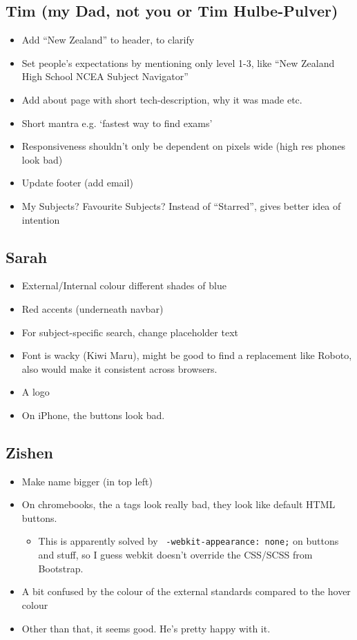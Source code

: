 \documentclass{article}
\begin{document}
\subsection*{Tim (my Dad, not you or Tim Hulbe-Pulver)}
\begin{itemize}
    \item Add ``New Zealand'' to header, to clarify
    \item Set people's expectations by mentioning only level 1-3, like ``New Zealand High School NCEA Subject Navigator''
    \item Add about page with short tech-description, why it was made etc.
    \item Short mantra e.g. `fastest way to find exams'
    \item Responsiveness shouldn't only be dependent on pixels wide (high res phones look bad)
    \item Update footer (add email)
    \item My Subjects? Favourite Subjects? Instead of ``Starred'', gives better idea of intention
\end{itemize}

\subsection*{Sarah}
\begin{itemize}
    \item External/Internal colour different shades of blue
    \item Red accents (underneath navbar)
    \item For subject-specific search, change placeholder text
    \item Font is wacky (Kiwi Maru), might be good to find a replacement like Roboto, also would make it consistent across browsers.
    \item A logo
    \item On iPhone, the buttons look bad.
\end{itemize}

\subsection*{Zishen}
\begin{itemize}
    \item Make name bigger (in top left)
    \item On chromebooks, the a tags look really bad, they look like default HTML buttons.
    \begin{itemize}
        \item This is apparently solved by \texttt{   -webkit-appearance: none;} on buttons and stuff, so I guess webkit doesn't override the CSS/SCSS from Bootstrap.
    \end{itemize}
    \item A bit confused by the colour of the external standards compared to the hover colour
    \item Other than that, it seems good. He's pretty happy with it.
\end{itemize}
\end{document}
